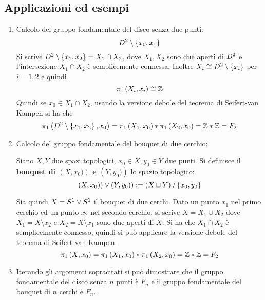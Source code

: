 \documentclass[]{article}
\begin{document}
\begin{proposition}  \nl
    
\end{proposition}

\begin{proposition}  \nl
    
\end{proposition}

\subsection{Applicazioni ed esempi}

\begin{enumerate}
    \item Calcolo del gruppo fondamentale del disco senza due punti:
            \[  
                D^{2} \setminus \left\{ x_0, x_1 \right\}
            \]
        Si scrive $D^{2}  \setminus \left\{ x_1, x_2 \right\} = X_1 \cap X_2$, dove $X_1, X_2$ sono due aperti di $D^{2}$ e
        l'intersezione $X_1 \cap X_2$ \`e semplicemente connessa. \nl
        Inoltre $X_i \cong D^{2} \setminus \left\{ x_i \right\}$ per $i = 1, 2$ e quindi
        \[
            \pi_1\left(X_i, x_i\right) \cong \mathbb{Z}
        \]
        Quindi se $x_0 \in X_1 \cap X_2$, usando la versione debole del teorema di Seifert-van Kampen si ha che
        \[
            \pi_1\left(D^{2} \setminus \left\{ x_1, x_2 \right\}, x_0\right) = \pi_1\left(X_1, x_0\right) * \pi_1\left(X_2, x_0\right) = \mathbb{Z} * \mathbb{Z} = F_2
        \]
        \item Calcolo del gruppo fondamentale del bouquet di due cerchio: \nl
        \begin{definition}  \nl
            Siano $X, Y$ due spazi topologici, $x_0 \in X, y_0 \in Y$ due punti. \nl
            Si definisce il \textbf{bouquet di $\left(X, x_0)\right)$ e $\left(Y, y_0)\right)$} lo spazio topologico:
            \[  
                \left(X, x_0)\right) \vee \left(Y, y_0)\right) := \left(X \sqcup Y\right) / \left\{ x_0, y_0 \right\}
            \]
        \end{definition}

        Sia quindi $X = S^{1} \vee S^{1}$ il bouquet di due cerchi. \nl
        Dato un punto $x_1$ nel primo cerchio ed un punto $x_2$ nel secondo cerchio, si scrive $X = X_1 \cup X_2$
        dove $X_1 = X \setminus {x_2}$ e $X_2 = X \setminus {x_1}$ sono due aperti di $X$.
        Si ha che $X_1 \cap X_2$ \`e semplicemente connesso, quindi si pu\`o applicare la versione debole del teorema di Seifert-van Kampen.
        \[
            \pi_1\left(X, x_0\right) = \pi_1\left(X_1, x_0\right) * \pi_1\left(X_2, x_0\right) = \mathbb{Z} * \mathbb{Z} = F_2
        \]
        \item Iterando gli argomenti sopracitati si pu\`o dimostrare che il gruppo fondamentale del disco senza $n$ punti \`e
        $F_n$ e il gruppo fondamentale del bouquet di $n$ cerchi \`e $F_n$.
\end{enumerate}
\end{document}
